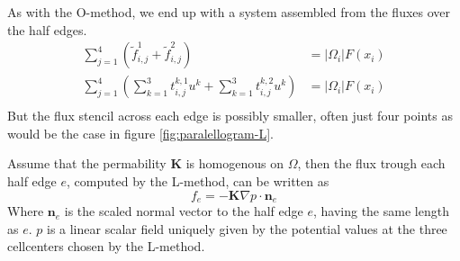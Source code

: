 \documentclass[../Main/main.tex]{subfiles}
\begin{document}
As with the O-method, we end up with a system assembled from the fluxes over the half edges.
\begin{equation}
	\begin{aligned}
		\sum_{j=1}^4 (\tilde{f}_{i,j}^1 + \tilde{f}_{i,j}^2) &= |\Omega_i|F(x_i) \\
		\sum_{j=1}^4 (\sum_{k=1}^3 t^{k,1}_{i,j}u^k + \sum_{k=1}^3 t^{k,2}_{i,j}u^k)&= |\Omega_i|F(x_i)\\
	\end{aligned}
\end{equation}
But the flux stencil across each edge is possibly smaller, often just four points as would be the case in figure \ref{fig:paralellogram-L}.

	\begin{lemma}
		Assume that the permability $\pmb{K}$ is homogenous on $\Omega$, then the flux trough each half edge $e$, computed by the L-method, can be written as
		\begin{equation}
			f_e = -\pmb{K} \nabla p \cdot \pmb{n}_e
		\end{equation}
		Where $\pmb{n}_e$ is the scaled normal vector to the half edge $e$, having the same length as $e$. $p$ is a linear scalar field uniquely given by the potential values at the three cellcenters chosen by the L-method.
	\end{lemma}
\end{document}
